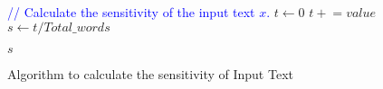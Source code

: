 \begin{algorithm*}[htbp]
\begin{minipage}{\textwidth}
\begin{algorithmic}[1]
\State \textcolor{blue}{// Calculate the sensitivity of the input text $x$.}
    \State $t \gets 0$ \Comment{\textcolor{blue}{A temporary variable.}}
        \State $t \mathrel{+}= value$
    \EndFor
    \State $s \gets t / Total\_words$
\EndIf

\Return $s$
\end{algorithmic}
\end{minipage}
\caption{Algorithm to calculate the sensitivity of Input Text}
\label{algo:alg_kp_sensitivity}

\end{algorithm*}

